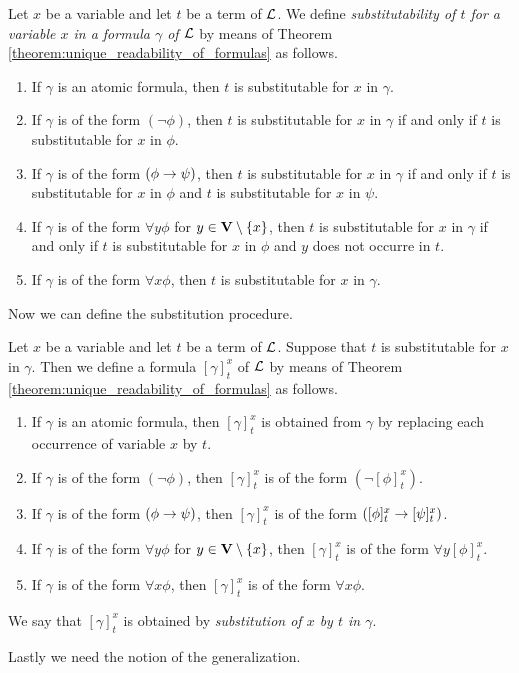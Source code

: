 \begin{definition}
Let $x$ be a variable and let $t$ be a term of ${\mathcal L}$. We define \textit{substitutability of $t$ for a variable $x$ in a formula $\gamma$ of ${\mathcal L}$} by means of Theorem \ref{theorem:unique_readability_of_formulas} as follows.
\begin{enumerate}[label=\textbf{(\arabic*)}, leftmargin=3.0em]
\item If $\gamma$ is an atomic formula, then $t$ is substitutable for $x$ in $\gamma$.
\item If $\gamma$ is of the form $(\neg \phi)$, then $t$ is substitutable for $x$ in $\gamma$ if and only if $t$ is substitutable for $x$ in $\phi$.
\item If $\gamma$ is of the form $(\phi \rightarrow  \psi)$, then $t$ is substitutable for $x$ in $\gamma$ if and only if $t$ is substitutable for $x$ in $\phi$ and $t$ is substitutable for $x$ in $\psi$.
\item If $\gamma$ is of the form $\forall y \phi$ for $y \in \mathbf{V}\setminus \{x\}$, then $t$ is substitutable for $x$ in $\gamma$ if and only if $t$ is substitutable for $x$ in $\phi$ and $y$ does not occurre in $t$.
\item If $\gamma$ is of the form $\forall x \phi$, then $t$ is substitutable for $x$ in $\gamma$.
\end{enumerate}
\end{definition}
\noindent
Now we can define the substitution procedure.

\begin{definition}
Let $x$ be a variable and let $t$ be a term of ${\mathcal L}$. Suppose that $t$ is substitutable for $x$ in $\gamma$. Then we define a formula $[\gamma]^x_t$ of ${\mathcal L}$ by means of Theorem \ref{theorem:unique_readability_of_formulas} as follows.
\begin{enumerate}[label=\textbf{(\arabic*)}, leftmargin=3.0em]
\item If $\gamma$ is an atomic formula, then $[\gamma]^x_t$ is obtained from $\gamma$ by replacing each occurrence of variable $x$ by $t$.
\item If $\gamma$ is of the form $(\neg \phi)$, then $[\gamma]^x_t$ is of the form $(\neg [\phi]^x_t)$.
\item If $\gamma$ is of the form $(\phi \rightarrow \psi)$, then $[\gamma]^x_t$ is of the form $([\phi]^x_t \rightarrow [\psi]^x_t)$.
\item If $\gamma$ is of the form $\forall y \phi$ for $y \in \mathbf{V} \setminus \{x\}$, then $[\gamma]^x_t$ is of the form $\forall y [\phi]^x_t$.
\item If $\gamma$ is of the form $\forall x\phi$, then $[\gamma]^x_t$ is of the form $\forall x\phi$.
\end{enumerate}
We say that $[\gamma]^x_t$ is obtained by \textit{substitution of $x$ by $t$ in $\gamma$}.
\end{definition}
\noindent
Lastly we need the notion of the generalization.

